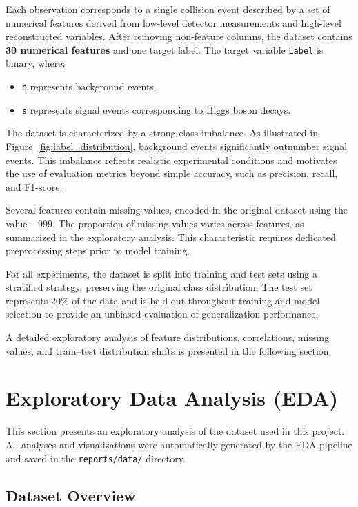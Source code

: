 \documentclass[12pt,a4paper]{article}
\begin{document}
Each observation corresponds to a single collision event described by a set of numerical features
derived from low-level detector measurements and high-level reconstructed variables.
After removing non-feature columns, the dataset contains \textbf{30 numerical features} and
one target label.
The target variable \texttt{Label} is binary, where:
\begin{itemize}
    \item \texttt{b} represents background events,
    \item \texttt{s} represents signal events corresponding to Higgs boson decays.
\end{itemize}

The dataset is characterized by a strong class imbalance.
As illustrated in Figure~\ref{fig:label_distribution}, background events significantly outnumber
signal events.
This imbalance reflects realistic experimental conditions and motivates the use of evaluation
metrics beyond simple accuracy, such as precision, recall, and F1-score.

Several features contain missing values, encoded in the original dataset using the value $-999$.
The proportion of missing values varies across features, as summarized in the exploratory analysis.
This characteristic requires dedicated preprocessing steps prior to model training.

For all experiments, the dataset is split into training and test sets using a stratified strategy,
preserving the original class distribution.
The test set represents 20\% of the data and is held out throughout training and model selection
to provide an unbiased evaluation of generalization performance.

A detailed exploratory analysis of feature distributions, correlations, missing values, and
train–test distribution shifts is presented in the following section.


\section{Exploratory Data Analysis (EDA)}

This section presents an exploratory analysis of the dataset used in this project.
All analyses and visualizations were automatically generated by the EDA pipeline
and saved in the \texttt{reports/data/} directory.

\subsection{Dataset Overview}
\end{document}

